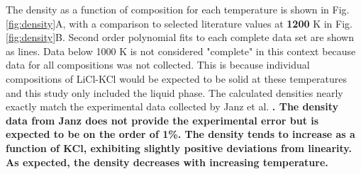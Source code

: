 \documentclass[review]{elsarticle}
\providecommand{\DIFaddtex}[1]{{\bf #1}} %
\providecommand{\DIFdeltex}[1]{} %
\providecommand{\DIFaddbegin}{\protect\color{blue}} %
\providecommand{\DIFaddend}{\protect\color{black}} %
\providecommand{\DIFdelbegin}{\protect\color{red}} %
\providecommand{\DIFdelend}{\protect\color{black}} %
\providecommand{\DIFadd}[1]{\texorpdfstring{\DIFaddtex{#1}}{#1}} %
\providecommand{\DIFdel}[1]{\texorpdfstring{\DIFdeltex{#1}}{}} %
\newcommand{\DIFscaledelfig}{0.5}
\newlength{\DIFdelgraphicswidth} %
\newlength{\DIFdelgraphicsheight} %
\newcommand{\DIFaddincludegraphics}[2][]{{\color{blue}\fbox{\DIFOincludegraphics[#1]{#2}}}} %
\newcommand{\DIFdelincludegraphics}[2][]{%
\sbox{\DIFdelgraphicsbox}{\DIFOincludegraphics[#1]{#2}}%
\settoboxwidth{\DIFdelgraphicswidth}{\DIFdelgraphicsbox} %
\settoboxtotalheight{\DIFdelgraphicsheight}{\DIFdelgraphicsbox} %
\scalebox{\DIFscaledelfig}{%
\parbox[b]{\DIFdelgraphicswidth}{\usebox{\DIFdelgraphicsbox}\\[-\baselineskip] \rule{\DIFdelgraphicswidth}{0em}}\llap{\resizebox{\DIFdelgraphicswidth}{\DIFdelgraphicsheight}{%
\setlength{\unitlength}{\DIFdelgraphicswidth}%
\begin{picture}(1,1)%
\thicklines\linethickness{2pt} %
{\color[rgb]{1,0,0}\put(0,0){\framebox(1,1){}}}%
{\color[rgb]{1,0,0}\put(0,0){\line( 1,1){1}}}%
{\color[rgb]{1,0,0}\put(0,1){\line(1,-1){1}}}%
\end{picture}%
}\hspace*{3pt}}} %
} %
\DeclareRobustCommand{\DIFaddbegin}{\DIFOaddbegin \let\includegraphics\DIFaddincludegraphics} %
\DeclareRobustCommand{\DIFaddend}{\DIFOaddend \let\includegraphics\DIFOincludegraphics} %
\DeclareRobustCommand{\DIFdelbegin}{\DIFOdelbegin \let\includegraphics\DIFdelincludegraphics} %
\DeclareRobustCommand{\DIFdelend}{\DIFOaddend \let\includegraphics\DIFOincludegraphics} %
\begin{document}
The density as a function of composition for each temperature is shown in Fig. \ref{fig:density}A, with a comparison to selected literature values at \DIFdelbegin \DIFdel{1100 }\DIFdelend \DIFaddbegin \DIFadd{1200 }\DIFaddend K in Fig. \ref{fig:density}B. Second order polynomial fits to each complete data set are shown as lines. Data below 1000 K is not considered "complete" in this context because data for all compositions was not collected. This is because individual compositions of LiCl-KCl would be expected to be solid at these temperatures and this study only included the liquid phase. The calculated densities nearly exactly match the experimental data collected by \DIFdelbegin \DIFdel{Wang et al. \cite{Wang2015}, but are slightly below the values calculated by }\DIFdelend Janz et al. \DIFdelbegin \DIFdel{\cite{Janz1988}. However, this discrepancy with Janz deceases as the concentration of KCl increases. The density tends to increase as a function of KCl, exhibiting slightly positive deviations from linearity. As expected, the density decreases with increasing temperature.  Finally, a comparison can be made to the Born-Mayer-Huggins interatomic potential employed in the classical molecular simulations by Wang et al. \cite{Wang2015}, which significantly underestimates the equilibrium density across the entire compositional range.This validates the use of DFT with vdW-DF2 van der Waals functional for the calculation of density in molten salt systems.
}\DIFdelend \DIFaddbegin \DIFadd{\cite{janz1975molten,van1955electrical}. The density data from Janz does not provide the experimental error but is expected to be on the order of 1\%. The density tends to increase as a function of KCl, exhibiting slightly positive deviations from linearity. As expected, the density decreases with increasing temperature.  
}\DIFaddend 
\end{document}

